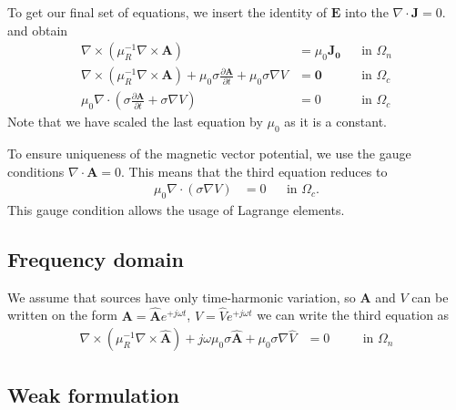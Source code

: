 \documentclass{article}
\newcommand{\curlp}[1]{\nabla \times \left(#1\right)}
\newcommand{\curl}[1]{\nabla \times #1}
\newcommand{\divmp}[1]{\nabla \cdot \left(#1\right)}
\newcommand{\divm}[1]{\nabla \cdot #1}
\newcommand{\mbf}[1]{\mathbf{#1}}
\begin{document}
To get our final set of equations, we insert the identity of $\mbf{E}$
into the $\divm{\mbf{J}}=0$. and obtain
\begin{subequations}
\begin{align}
    \curlp{\mu_R^{-1} \curl{\mbf{A}}} &= \mu_0\mbf{J_0}&&\text{in } \Omega_n\\
     \curlp{\mu_R^{-1} \curl{\mbf{A}}} + \mu_0\sigma\frac{\partial \mbf{A}}{\partial t} + \mu_0\sigma \nabla V &= \mbf{0} &&\text{in } \Omega_c\label{eq:strong2}\\
    \mu_0\divmp{\sigma \frac{\partial \mbf{A}}{\partial t} + \sigma \nabla V} &=0 &&\text{in } \Omega_c
\end{align}
\end{subequations}
Note that we have scaled the last equation by $\mu_0$ as it is a constant.

To ensure uniqueness of the magnetic vector potential, we use the gauge conditions
$\nabla \cdot \mbf{A}=0$.
This means that the third equation reduces to
\begin{align}
    \mu_0\divmp{ \sigma \nabla V} &=0&&\text{in } \Omega_c.
\end{align}
This gauge condition allows the usage of Lagrange elements.

\subsection{Frequency domain}

We assume that sources have only time-harmonic variation, so $\mbf{A}$
and $V$ can be written on the form $\mbf{A}=\hat{\mbf{A}} e^{+j\omega
t}$, $V= \hat{V} e^{+j\omega t}$ we can write the third equation as
\begin{align}
    \curlp{\mu_R^{-1} \curl{\hat{\mbf{A}}}} +j\omega \mu_0\sigma \hat{\mbf{A}} + \mu_0\sigma \nabla \hat{V} &= 0&&\quad \text{in } \Omega_n
\end{align}

\subsection{Weak formulation}
\end{document}
